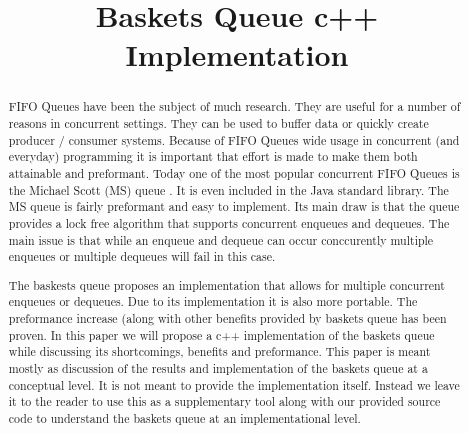 \documentclass[conference]{IEEEtran}
\begin{document}
%
\title{Baskets Queue c++ Implementation}


\author{
\and
{}
\and
{}
}

\maketitle

\begin{abstract}
FIFO Queues have been the subject of much research.  They are useful for a number of reasons in concurrent settings.  They can be used to buffer data or quickly create producer / consumer systems.  Because of FIFO Queues wide usage in concurrent (and everyday) programming it is important that effort is made to make them both attainable and preformant.  Today one of the most popular concurrent FIFO Queues is the Michael Scott (MS) queue \cite{ms}.  It is even included in the Java standard library.  The MS queue is fairly preformant and easy to implement.  Its main draw is that the queue provides a lock free algorithm that supports concurrent enqueues and dequeues.  The main issue is that while an enqueue and dequeue can occur conccurently multiple enqueues or multiple dequeues will fail in this case.  \break

The baskests queue \cite{baskets} proposes an implementation that allows for multiple concurrent enqueues or dequeues.  Due to its implementation it is also more portable.  The preformance increase (along with other benefits provided by baskets queue has been proven.  In this paper we will propose a c++ implementation of the baskets queue while discussing its shortcomings, benefits and preformance.  This paper is meant mostly as  discussion of the results and implementation of the baskets queue at a conceptual level.  It is not meant to provide the implementation itself.  Instead we leave it to the reader to use this as a supplementary tool along with our provided source code to understand the baskets queue at an implementational level.
\end{abstract}
\end{document}

